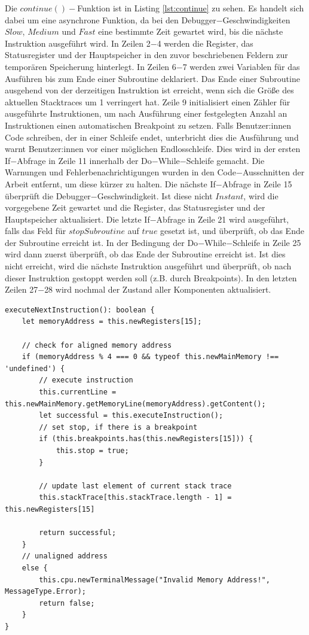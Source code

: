 \documentclass[a4paper, 11pt, onecolumn]{article}
\begin{document}
Die $continue()-$Funktion ist in Listing \ref{lst:continue} zu sehen. Es handelt sich dabei um eine asynchrone Funktion, da bei den Debugger$-$Geschwindigkeiten $Slow$, $Medium$ und $Fast$ eine bestimmte Zeit gewartet wird, bis die nächste Instruktion ausgeführt wird. In Zeilen 2$-$4 werden die Register, das Statusregister und der Hauptspeicher in den zuvor beschriebenen Feldern zur temporären Speicherung hinterlegt. In Zeilen 6$-$7 werden zwei Variablen für das Ausführen bis zum Ende einer Subroutine deklariert. Das Ende einer Subroutine ausgehend von der derzeitigen Instruktion ist erreicht, wenn sich die Größe des aktuellen Stacktraces um 1 verringert hat. Zeile 9 initialisiert einen Zähler für ausgeführte Instruktionen, um nach Ausführung einer festgelegten Anzahl an Instruktionen einen automatischen Breakpoint zu setzen. Falls Benutzer:innen Code schreiben, der in einer Schleife endet, unterbricht dies die Ausführung und warnt Benutzer:innen vor einer möglichen Endlosschleife. Dies wird in der ersten If$-$Abfrage in Zeile 11 innerhalb der Do$-$While$-$Schleife gemacht. Die Warnungen und Fehlerbenachrichtigungen wurden in den Code$-$Ausschnitten der Arbeit entfernt, um diese kürzer zu halten. Die nächste If$-$Abfrage in Zeile 15 überprüft die Debugger$-$Geschwindigkeit. Ist diese nicht $Instant$, wird die vorgegebene Zeit gewartet und die Register, das Statusregister und der Hauptspeicher aktualisiert. Die letzte If$-$Abfrage in Zeile 21 wird ausgeführt, falls das Feld für $stopSubroutine$ auf $true$ gesetzt ist, und überprüft, ob das Ende der Subroutine erreicht ist. In der Bedingung der Do$-$While$-$Schleife in Zeile 25 wird dann zuerst überprüft, ob das Ende der Subroutine erreicht ist. Ist dies nicht erreicht, wird die nächste Instruktion ausgeführt und überprüft, ob nach dieser Instruktion gestoppt werden soll (z.B. durch Breakpoints). In den letzten Zeilen 27$-$28 wird nochmal der Zustand aller Komponenten aktualisiert. \\

\begin{lstlisting}[style=JavaScript, basicstyle=\footnotesize, backgroundcolor=\color{backcolour}, caption={[Funktion $-$ Ausführen der nächsten Instruktion]Funktion zum Ausführen der nächsten Instruktion}, captionpos=b, label={lst:execNext}]
executeNextInstruction(): boolean {
    let memoryAddress = this.newRegisters[15];

    // check for aligned memory address
    if (memoryAddress % 4 === 0 && typeof this.newMainMemory !== 'undefined') {
        // execute instruction
        this.currentLine = this.newMainMemory.getMemoryLine(memoryAddress).getContent();
        let successful = this.executeInstruction();
        // set stop, if there is a breakpoint
        if (this.breakpoints.has(this.newRegisters[15])) {
            this.stop = true;
        }

        // update last element of current stack trace
        this.stackTrace[this.stackTrace.length - 1] = this.newRegisters[15]

        return successful;
    }
    // unaligned address
    else {
        this.cpu.newTerminalMessage("Invalid Memory Address!", MessageType.Error);
        return false;
    }
}   	
\end{lstlisting}
\end{document}
